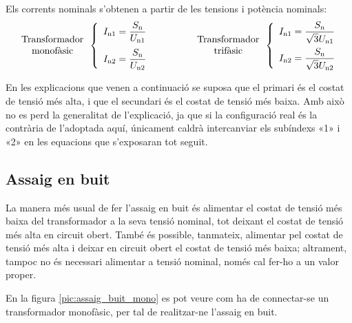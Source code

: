 Els corrents nominals s'obtenen a partir de les tensions i potència
nominals:
\begin{equation}
\begin{array}{c}\text{Transformador}\\
\text{monofàsic}
\end{array} \left\{
\begin{array}{l}
   I_\mathrm{n1} = \dfrac{S_\mathrm{n}}{U_\mathrm{n1}} \\[2.7ex]
   I_\mathrm{n2} = \dfrac{S_\mathrm{n}}{U_\mathrm{n2}}
\end{array}
\right. \qquad\qquad
\begin{array}{c}\text{Transformador}\\
\text{trifàsic}
\end{array} \left\{
\begin{array}{l}
   I_\mathrm{n1} = \dfrac{S_\mathrm{n}}{\sqrt{3}U_\mathrm{n1}} \\[2.5ex]
   I_\mathrm{n2} = \dfrac{S_\mathrm{n}}{\sqrt{3}U_\mathrm{n2}}
\end{array}
\right.
\end{equation}

En les explicacions que venen a continuació se suposa que el
primari és el costat de tensió més alta, i que el secundari és el costat de tensió més baixa. Amb això no es perd la generalitat de
l'explicació, ja que si la configuració real és la contrària de l'adoptada aquí, únicament caldrà intercanviar els subíndexs «1» i «2» en
les equacions que s'exposaran tot seguit.

\subsection{Assaig en buit}

La manera més usual de fer l'assaig en buit és alimentar el costat
de  tensió més baixa del transformador a  la seva tensió nominal, tot
deixant el costat de tensió més alta en circuit obert. També és possible,
tanmateix, alimentar pel costat de tensió més alta i deixar en circuit
obert el costat de  tensió més baixa; altrament, tampoc no és necessari
alimentar a tensió nominal, només cal fer-ho a un valor proper.

En la figura \vref{pic:assaig_buit_mono} es pot veure com ha de
connectar-se un transformador monofàsic, per tal de realitzar-ne
l'assaig en buit.

\begin{center}
    
    \label{pic:assaig_buit_mono}
\end{center}

